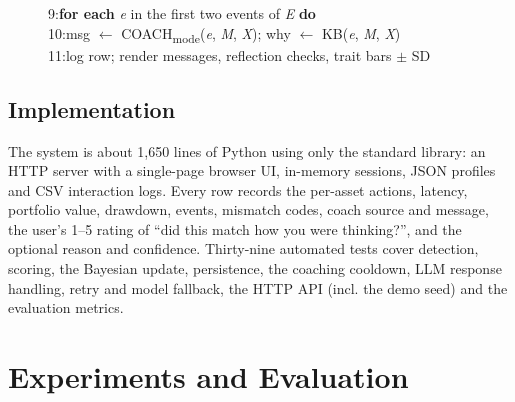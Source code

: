 \documentclass[conference]{IEEEtran}
\begin{document}
\begin{figure}[t]
{\begin{minipage}{0.95\columnwidth}
{\scriptsize 9:}\hspace{0.6em}\textbf{for each} \textit{e} in the first two events of \textit{E} \textbf{do}\\
{\scriptsize 10:}\hspace{1.8em}msg \ensuremath{\leftarrow} COACH\textsubscript{mode}(\textit{e}, \textit{M}, \textit{X});  why \ensuremath{\leftarrow} KB(\textit{e}, \textit{M}, \textit{X})\\
{\scriptsize 11:}\hspace{0.6em}log row; render messages, reflection checks, trait bars \ensuremath{\pm} SD\\
\end{minipage}}
\end{figure}
\subsection{Implementation}
The system is about 1,650 lines of Python using only the standard library: an HTTP server with a single-page browser UI, in-memory sessions, JSON profiles and CSV interaction logs. Every row records the per-asset actions, latency, portfolio value, drawdown, events, mismatch codes, coach source and message, the user's 1--5 rating of ``did this match how you were thinking?'', and the optional reason and confidence. Thirty-nine automated tests cover detection, scoring, the Bayesian update, persistence, the coaching cooldown, LLM response handling, retry and model fallback, the HTTP API (incl. the demo seed) and the evaluation metrics.

\section{Experiments and Evaluation}
\end{document}
